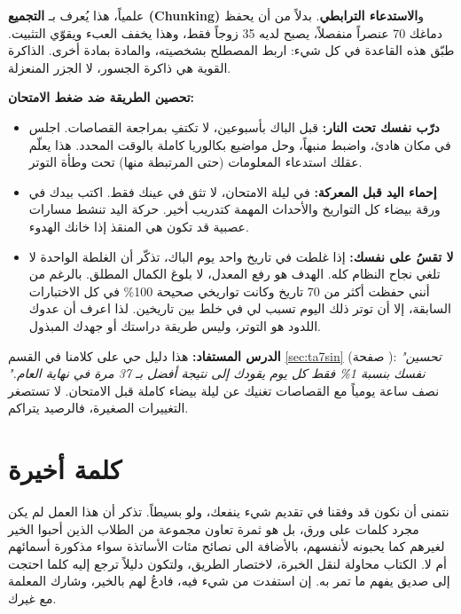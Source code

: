\documentclass[12pt,a4paper]{book}
\begin{document}
	علمياً، هذا يُعرف بـ \textbf{التجميع (Chunking)} و\textbf{الاستدعاء الترابطي}. بدلاً من أن يحفظ دماغك 70 عنصراً منفصلاً، يصبح لديه 35 زوجاً فقط، وهذا يخفف العبء ويقوّي التثبيت. طبّق هذه القاعدة في كل شيء: اربط المصطلح بشخصيته، والمادة بمادة أخرى. الذاكرة القوية هي ذاكرة الجسور، لا الجزر المنعزلة.
	
	\vspace{1em}
	\textbf{تحصين الطريقة ضد ضغط الامتحان:}
	\begin{itemize}
		\item \textbf{درّب نفسك تحت النار:} قبل الباك بأسبوعين، لا تكتفِ بمراجعة القصاصات. اجلس في مكان هادئ، واضبط منبهاً، وحل مواضيع بكالوريا كاملة بالوقت المحدد. هذا يعلّم عقلك استدعاء المعلومات (حتى المرتبطة منها) تحت وطأة التوتر.
		\item \textbf{إحماء اليد قبل المعركة:} في ليلة الامتحان، لا تثق في عينك فقط. اكتب بيدك في ورقة بيضاء كل التواريخ والأحداث المهمة كتدريب أخير. حركة اليد تنشط مسارات عصبية قد تكون هي المنقذ إذا خانك الهدوء.
		\item \textbf{لا تقسُ على نفسك:} إذا غلطت في تاريخ واحد يوم الباك، تذكّر أن الغلطة الواحدة لا تلغي نجاح النظام كله. الهدف هو رفع المعدل، لا بلوغ الكمال المطلق. بالرغم من أنني حفظت أكثر من 70 تاريخ وكانت تواريخي صحيحة 100\% في كل الاختبارات السابقة، إلا أن توتر ذلك اليوم تسبب لي في خلط بين تاريخين. لذا اعرف أن عدوك اللدود هو التوتر، وليس طريقة دراستك أو جهدك المبذول.
	\end{itemize}
	
	\vspace{1em}
	\textbf{الدرس المستفاد:} هذا دليل حي على كلامنا في القسم \ref{sec:ta7sin} (صفحة \pageref{sec:ta7sin}): \textit{"تحسين نفسك بنسبة 1\% فقط كل يوم يقودك إلى نتيجة أفضل بـ 37 مرة في نهاية العام."} نصف ساعة يومياً مع القصاصات تغنيك عن ليلة بيضاء كاملة قبل الامتحان. لا تستصغر التغييرات الصغيرة، فالرصيد يتراكم.
	
	
	
	
	\chapter*{كلمة أخيرة}
	
	 	نتمنى أن نكون قد وفقنا في تقديم شيء ينفعك، ولو بسيطاً. تذكر أن هذا العمل لم يكن مجرد كلمات على ورق، بل هو ثمرة تعاون مجموعة من الطلاب الذين أحبوا الخير لغيرهم كما يحبونه لأنفسهم، بالأضافة الى نصائح مئات الأساتذة سواء مذكورة أسمائهم أم لا. الكتاب محاولة لنقل الخبرة، لاختصار الطريق، ولتكون دليلاً ترجع إليه كلما احتجت إلى صديق يفهم ما تمر به. إن استفدت من شيء فيه، فادعُ لهم بالخير، وشارك المعلمة مع غيرك.
	 	
\end{document}
